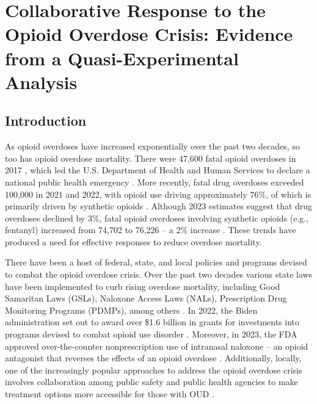 \chapter{Collaborative Response to the Opioid Overdose Crisis: Evidence from a Quasi-Experimental Analysis}

\section{\centering Introduction}
As opioid overdoses have increased exponentially over the past two decades, so too has opioid overdose mortality. There were 47,600 fatal opioid overdoses in 2017 \parencite{wilson_drug_2020}, which led the U.S. Department of Health and Human Services to declare a national public health emergency \parencite{johnson_trump_2017}. More recently, fatal drug overdoses exceeded 100,000 in 2021 and 2022, with opioid use driving approximately 76\%, of which is primarily driven by synthetic opioids \parencite{center_for_disease_control_and_prevention_national_2023}. Although 2023 estimates suggest that drug overdoses declined by 3\%, fatal opioid overdoses involving synthetic opioids (e.g., fentanyl) increased from 74,702 to 76,226 -- a 2\% increase \parencite{center_for_disease_control_and_prevention_us_2024}. These trends have produced a need for effective responses to reduce overdose mortality.

There have been a host of federal, state, and local policies and programs devised to combat the opioid overdose crisis. Over the past two decades various state laws have been implemented to curb rising overdose mortality, including Good Samaritan Laws (GSLs), Naloxone Access Laws (NALs), Prescription Drug Monitoring Programs (PDMPs), among others \parencite{haegerich_evidence_2019}. In 2022, the Biden administration set out to award over \$1.6 billion in grants for investments into programs devised to combat opioid use disorder \parencite{us_department_of_health_and_human_services_biden-harris_2022}. Moreover, in 2023, the FDA approved over-the-counter nonprescription use of intranasal naloxone -- an opioid antagonist that reverses the effects of an opioid overdose \parencite{us_food_and_drug_administration_fda_2023}. Additionally, locally, one of the increasingly popular approaches to address the opioid overdose crisis involves collaboration among public safety and public health agencies to make treatment options more accessible for those with OUD \parencite{yatsco_developing_2020}. 

